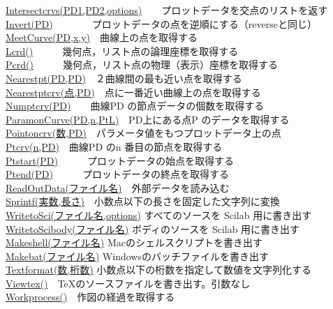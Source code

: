 \documentclass[papersize,a4paper,12pt,uplatex]{jsarticle}
\begin{document}
\begin{tabbing}
\hyperlink{intersectcrvs}{Intersectcrvs(PD1,PD2,options)}　　\>プロットデータを交点のリストを返す\\
\hyperlink{invert}{Invert(PD)}　　　　\>プロットデータの点を逆順にする（reverseと同じ）\\
\hyperlink{meetcurve}{MeetCurve(PD,x,y)}　\>曲線上の点を取得する\\
\hyperlink{lcrd}{Lcrd()}　　　\>幾何点，リスト点の論理座標を取得する\\
\hyperlink{pcrd}{Pcrd()}　　　\>幾何点，リスト点の物理（表示）座標を取得する\\
\hyperlink{nearestpt}{Nearestpt(PD,PD)}　\>２曲線間の最も近い点を取得する\\
\hyperlink{nearestptcrv}{Nearestptcrv(点,PD)}　\>点に一番近い曲線上の点を取得する\\
\hyperlink{numptcrv}{Numptcrv(PD)}　　\>曲線PD の節点データの個数を取得する\\
\hyperlink{paramoncurve}{ParamonCurve(PD,n,PtL)}　\>PD上にある点P のデータを取得する\\
\hyperlink{pointoncrv}{Pointoncrv(数,PD)}　\>パラメータ値をもつプロットデータ上の点\\
\hyperlink{ptcrv}{Ptcrv(n,PD)}　\>曲線PD のn 番目の節点を取得する\\
\hyperlink{ptstart}{Ptstart(PD)}　　　\>プロットデータの始点を取得する\\
\hyperlink{ptstart}{Ptend(PD)}　　　\>プロットデータの終点を取得する\\
\hyperlink{readoutdata}{ReadOutData(ファイル名)}　\>外部データを読み込む\\
\hyperlink{sprintf}{Sprintf(実数,長さ)}　\>小数点以下の長さを固定した文字列に変換\\
\hyperlink{writetosci}{WritetoSci(ファイル名,options)}     \>すべてのソースを Scilab 用に書き出す\\
\hyperlink{writetosci}{WritetoScibody(ファイル名)}  \>ボディのソースを Scilab 用に書き出す\\
\hyperlink{makeshell}{Makeshell(ファイル名)}  \>Macのシェルスクリプトを書き出す\\
\hyperlink{makeshell}{Makebat(ファイル名)}   \>Windowsのバッチファイルを書き出す\\
\hyperlink{textformat}{Textformat(数,桁数)}   \>小数点以下の桁数を指定して数値を文字列化する\\
\hyperlink{viewtex}{Viewtex()}　\>\TeX のソースファイルを書き出す。引数なし\\
 \hyperlink{workprocess}{Workprocess()}　\>作図の経過を取得する\\

\end{tabbing}
\end{document}
